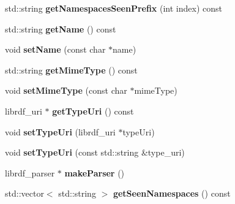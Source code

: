 \begin{DoxyCompactItemize}
\mbox{\label{classredland_1_1LibrdfParser_a89d1335343c9999db8207866de8202c1}} 
std\+::string {\bfseries get\+Namespaces\+Seen\+Prefix} (int index) const
\item 
\mbox{\label{classredland_1_1LibrdfParser_aaa813cd98f57703e2168e81cf1c8b356}} 
std\+::string {\bfseries get\+Name} () const
\item 
\mbox{\label{classredland_1_1LibrdfParser_a152feb7bf2aa291fc7ec48fe2769265a}} 
void {\bfseries set\+Name} (const char $\ast$name)
\item 
\mbox{\label{classredland_1_1LibrdfParser_aacf1514391f15d3687a35352f1c0da3d}} 
std\+::string {\bfseries get\+Mime\+Type} () const
\item 
\mbox{\label{classredland_1_1LibrdfParser_a8fe0e89950e9b71f86fa58e10eb475d8}} 
void {\bfseries set\+Mime\+Type} (const char $\ast$mime\+Type)
\item 
\mbox{\label{classredland_1_1LibrdfParser_ae6f233d632e3a515afe7afceabf4e5ef}} 
librdf\+\_\+uri $\ast$ {\bfseries get\+Type\+Uri} () const
\item 
\mbox{\label{classredland_1_1LibrdfParser_a81d772e0be266b00bf840fd9dbeab8d1}} 
void {\bfseries set\+Type\+Uri} (librdf\+\_\+uri $\ast$type\+Uri)
\item 
\mbox{\label{classredland_1_1LibrdfParser_a76ecf31cd9fb96ba4e10a35f383e47fc}} 
void {\bfseries set\+Type\+Uri} (const std\+::string \&type\+\_\+uri)
\item 
\mbox{\label{classredland_1_1LibrdfParser_a8055c22ada8b852112f4f011d9fa5abe}} 
librdf\+\_\+parser $\ast$ {\bfseries make\+Parser} ()
\item 
\mbox{\label{classredland_1_1LibrdfParser_a2c600b9ae3b59e4ae7e48b20e3513cb4}} 
std\+::vector$<$ std\+::string $>$ {\bfseries get\+Seen\+Namespaces} () const
\end{DoxyCompactItemize}
